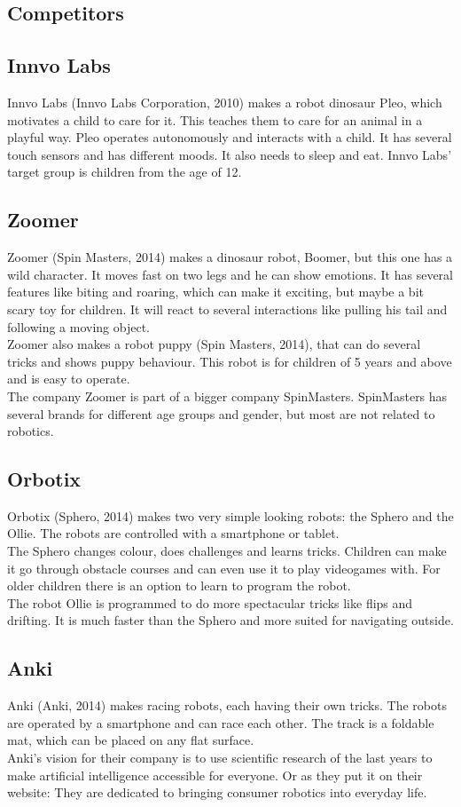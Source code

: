 \documentclass[11pt,twoside,a4paper]{report}
\begin{document}
\begin{appendices}
\chapter{Competitors}
\label{appendix:competitors}
\section{Innvo Labs}
Innvo Labs (Innvo Labs Corporation, 2010) makes a robot dinosaur Pleo, which motivates a child to care for it. This teaches them to care for an animal in a playful way. Pleo operates autonomously and interacts with a child. It has several touch sensors and has different moods. It also needs to sleep and eat. Innvo Labs’ target group is children from the age of 12.
\section{Zoomer}
Zoomer (Spin Masters, 2014) makes a dinosaur robot, Boomer, but this one has a wild character. It moves fast on two legs and he can show emotions. It has several features like biting and roaring, which can make it exciting, but maybe a bit scary toy for children. It will react to several interactions like pulling his tail and following a moving object. \\
Zoomer also makes a robot puppy (Spin Masters, 2014), that can do several tricks and shows puppy behaviour. This robot is for children of 5 years and above and is easy to operate. \\
The company Zoomer is part of a bigger company SpinMasters. SpinMasters has several brands for different age groups and gender, but most are not related to robotics.
\section{Orbotix}
Orbotix (Sphero, 2014) makes two very simple looking robots: the Sphero and the Ollie. The robots are controlled with a smartphone or tablet. \\
The Sphero changes colour, does challenges and learns tricks. Children can make it go through obstacle courses and can even use it to play videogames with. For older children there is an option to learn to program the robot. \\
The robot Ollie is programmed to do more spectacular tricks like flips and drifting. It is much faster than the Sphero and more suited for navigating outside.
\section{Anki}
Anki (Anki, 2014) makes racing robots, each having their own tricks. The robots are operated by a smartphone and can race each other. The track is a foldable mat, which can be placed on any flat surface. \\
Anki’s vision for their company is to use scientific research of the last years to make artificial intelligence accessible for everyone. Or as they put it on their website: They are dedicated to bringing consumer robotics into everyday life.

\end{appendices}
\end{document}
